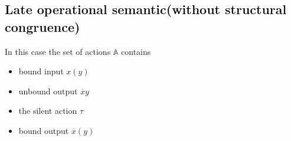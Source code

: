 %   






\subsection{Late operational semantic(without structural congruence)}


In this case the set of actions $\mathbb{A}$ contains
\begin{itemize}
      \item bound input $x(y)$
      \item unbound output $\overline{x}y$
      \item the silent action $\tau$
      \item bound output $\overline{x}(y)$
\end{itemize}


